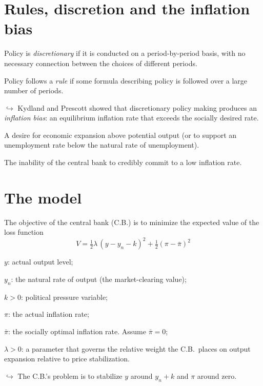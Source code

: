 \documentclass[11pt]{article}
\begin{document}


\section{Rules, discretion and the inflation bias}

 Policy is \emph{discretionary} if it is conducted on a
period-by-period basis, with no necessary connection between the choices of different
periods.

 Policy follows a \emph{rule} if some formula describing policy is followed
over a large number of periods.

$\hookrightarrow$ Kydland and Prescott showed that discretionary policy making produces an
\emph{inflation bias}: an equilibrium inflation rate that exceeds the socially desired rate.

\begin{flatnum}
  \item[(i)] A desire for economic expansion above potential output (or to support an
        unemployment rate below the natural rate of unemployment).
  \item[(ii)] The inability of the central bank to credibly commit to a low inflation rate.
\end{flatnum}


\section{The model}

The objective of the central bank (C.B.) is to minimize the expected value of the loss
function
\begin{equation}
  V=\tfrac12\lambda\,(y-y_n-k)^2+\tfrac12(\pi-\bar\pi)^2 \tag{1}\label{m:loss}
\end{equation}
\begin{flatlist}
  \item $y$: actual output level;
  \item $y_n$: the natural rate of output (the market-clearing value);
  \item $k>0$: political pressure variable;
  \item $\pi$: the actual inflation rate;
  \item $\bar\pi$: the socially optimal inflation rate. Assume $\bar\pi=0$;
  \item $\lambda>0$: a parameter that governs the relative weight the C.B.\ places on
        output expansion relative to price stabilization.
\end{flatlist}
$\hookrightarrow$ The C.B.'s problem is to stabilize $y$ around $y_n+k$ and $\pi$ around zero.
\end{document}
